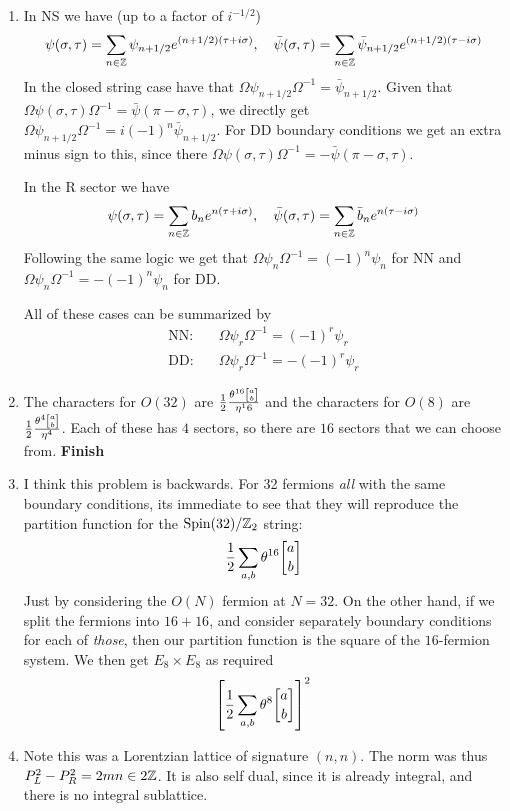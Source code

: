 \documentclass[11pt, class=article, crop=false]{standalone}
\begin{document}
\begin{enumerate}
	\item In NS we have (up to a factor of $i^{-1/2}$)
	\[
		\psi(\sigma, \tau) = \sum_{n\in \mathbb{Z}} \psi_{n+1/2} e^{(n+1/2) (\tau + i \sigma)}, \quad \bar \psi(\sigma, \tau) = \sum_{n\in \mathbb{Z}} \bar \psi_{n+1/2} e^{(n+1/2) (\tau - i \sigma)}
	\]
	In the closed string case have that $\Omega \psi_{n+1/2} \Omega^{-1} = \bar \psi_{n+1/2}$. 
	Given that $\Omega \psi(\sigma, \tau) \Omega^{-1} = \bar \psi(\pi - \sigma, \tau)$, we directly get $\Omega \psi_{n+1/2} \Omega^{-1} = i (-1)^n \bar \psi_{n+1/2}$. For DD boundary conditions we get an extra minus sign to this, since there $\Omega \psi(\sigma, \tau) \Omega^{-1} = - \bar \psi(\pi - \sigma, \tau)$. 
	
	In the R sector we have
	\[
		\psi(\sigma, \tau) = \sum_{n\in \mathbb{Z}} b_n e^{n (\tau + i \sigma)}, \quad \bar \psi(\sigma, \tau) = \sum_{n\in \mathbb{Z}} \bar b_n e^{n (\tau - i \sigma)}
	\]
	Following the same logic we get that $\Omega \psi_{n} \Omega^{-1} = (-1)^n \psi_n$ for NN and $\Omega \psi_{n} \Omega^{-1} = -(-1)^n \psi_n$ for DD.
	
	All of these cases can be summarized by
	\[
		\begin{aligned}
			\text{NN:}\quad & \Omega \psi_r \Omega^{-1} = (-1)^r \psi_r \\ 
			\text{DD:}\quad & \Omega \psi_r \Omega^{-1} = - (-1)^r \psi_r
		\end{aligned}
	\]
	\item The characters for $O(32)$ are $\frac12 \frac{\theta^{16} \twist ab}{\eta^16}$ and the characters for $O(8)$ are $\frac12 \frac{\theta^4 \twist ab}{\eta^4}$. Each of these has $4$ sectors, so there are $16$ sectors that we can choose from. \textbf{Finish}
	
	\item I think this problem is backwards. For 32 fermions \emph{all} with the same boundary conditions, its immediate to see that they will reproduce the partition function for the $\mathrm{Spin}(32)/\mathbb{Z}_2$ string:
	\[
		\frac12 \sum_{a,b} \theta^{16}\twist ab
	\]
	Just by considering the $O(N)$ fermion at $N=32$. On the other hand, if we split the fermions into $16+16$, and consider separately boundary conditions for each of \emph{those}, then our partition function is the square of the $16$-fermion system. We then get $E_8 \times E_8$ as required
	\[
		\left[ \frac12 \sum_{a,b} \theta^{8}\twist ab \right]^2
	\]
	\item Note this was a Lorentzian lattice of signature $(n,n)$. The norm was thus $P_L^2 - P_R^2 = 2 m n \in 2 \mathbb{Z}$. It is also self dual, since it is already integral, and there is no integral sublattice. 
	

\end{enumerate}
\end{document}
